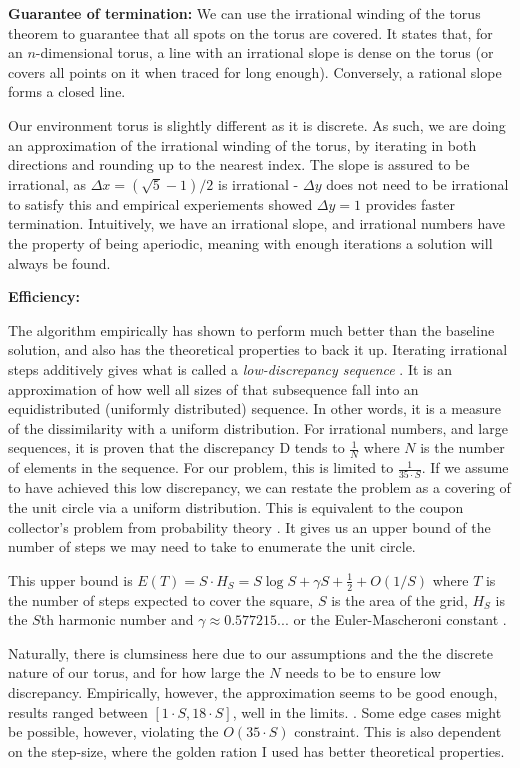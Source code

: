 \documentclass{article}
\begin{document}
\textbf{Guarantee of termination:} We can use the irrational winding of the torus theorem to guarantee that all spots on the torus are covered. It states that, for an
$n$-dimensional torus, a line with an irrational slope is dense on the torus (or covers all points on it when traced for long enough)\cite{irrational-torus}. Conversely, a rational slope forms a closed line.

Our environment torus is slightly different as it is discrete. As such, we are
doing an approximation of the irrational winding of the torus, by iterating in
both directions and rounding up to the nearest index. The slope is assured to
be irrational, as $\Delta x = (\sqrt 5 - 1)/2$ is irrational - $\Delta y$ does
not need to be irrational to satisfy this and empirical experiements showed $
    \Delta y=1$ provides faster termination. Intuitively, we have an irrational
slope, and irrational numbers have the property of being aperiodic, meaning
with enough iterations a solution will always be found.

\textbf{Efficiency:}

The algorithm empirically has shown to perform much better than the baseline
solution, and also has the theoretical properties to back it up. Iterating
irrational steps additively gives what is called a \textit{low-discrepancy
    sequence} \cite{low-discrepancy-seq}. It is an approximation of how well all
sizes of that subsequence fall into an equidistributed (uniformly distributed)
sequence. In other words, it is a measure of the dissimilarity with a uniform
distribution. For irrational numbers, and large sequences, it is proven that
the discrepancy D tends to $\frac{1}{N}$ where $N$ is the number of elements in
the sequence. For our problem, this is limited to $\frac{1}{35\cdot S}$. If we
assume to have achieved this low discrepancy, we can restate the problem as a
covering of the unit circle via a uniform distribution. This is equivalent to
the coupon collector's problem from probability theory \cite{coupon-collector}.
It gives us an upper bound of the number of steps we may need to take to
enumerate the unit circle.

This upper bound is ${E} (T)=S\cdot H_{S}=S\log S+\gamma S+{\frac
    {1}{2}}+O(1/S)$ where $T$ is the number of steps expected to cover the square,
$S$ is the area of the grid, $H_S$ is the $S$th harmonic number and $\gamma
    \approx 0.577215...$ or the Euler-Mascheroni constant \cite{coupon-collector}.

Naturally, there is clumsiness here due to our assumptions and the the discrete
nature of our torus, and for how large the $N$ needs to be to ensure low
discrepancy. Empirically, however, the approximation seems to be good enough,
results ranged between $[1 \cdot S, 18\cdot S]$, well in the limits. . Some
edge cases might be possible, however, violating the $O(35\cdot S) $
constraint. This is also dependent on the step-size, where the golden ration I
used has better theoretical properties.
\end{document}

